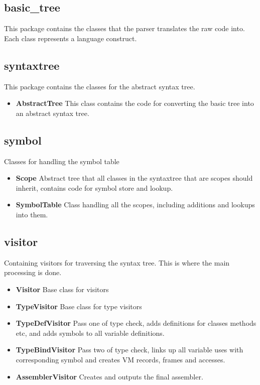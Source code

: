 \documentclass[a4paper,11pt]{article}
\begin{document}
  \subsection{basic\_tree}
     This package contains the classes that the parser translates the raw code into. Each class represents a language construct.

  \subsection{syntaxtree}
     This package contains the classes for the abstract syntax tree.
     \begin{itemize}
        \item \textbf{AbstractTree} This class contains the code for converting the basic tree into an abstract syntax tree.
     \end{itemize}

  \subsection{symbol}
     Classes for handling the symbol table
     \begin{itemize}
        \item \textbf{Scope} Abstract tree that all classes in the syntaxtree that are scopes should inherit, contains code for symbol store and lookup.
        \item \textbf{SymbolTable} Class handling all the scopes, including additions and lookups into them.
     \end{itemize}

  \subsection{visitor}
     Containing visitors for traversing the syntax tree. This is where the main processing is done.
     \begin{itemize}
        \item \textbf{Visitor} Base class for visitors
        \item \textbf{TypeVisitor} Base class for type visitors
        \item \textbf{TypeDefVisitor} Pass one of type check, adds definitions for classes methods etc, and adds symbols to all variable definitions.
        \item \textbf{TypeBindVisitor} Pass two of type check, links up all variable uses with corresponding symbol and creates VM records, frames and accesses.
        \item \textbf{AssemblerVisitor} Creates and outputs the final assembler.
     \end{itemize}
\end{document}
